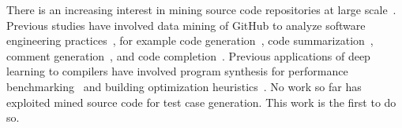 There is an increasing interest in mining source code repositories at large scale~\cite{Allamanis2013a,White2015a,Bird2009}. Previous studies have involved data mining of GitHub to analyze software engineering practices~\cite{Wu2014,Guzman2014,Baishakhi2014a,Vasilescu2015}, for example code generation~\cite{Zhang2015a}, code summarization~\cite{Allamanis2016}, comment generation~\cite{Wong2013}, and code completion~\cite{Raychev2014}. Previous applications of deep learning to compilers have involved program synthesis for performance benchmarking~\cite{Cummins2017a} and building optimization heuristics~\cite{Cummins2017b}. No work so far has exploited mined source code for test case generation. This work is the first to do so.
